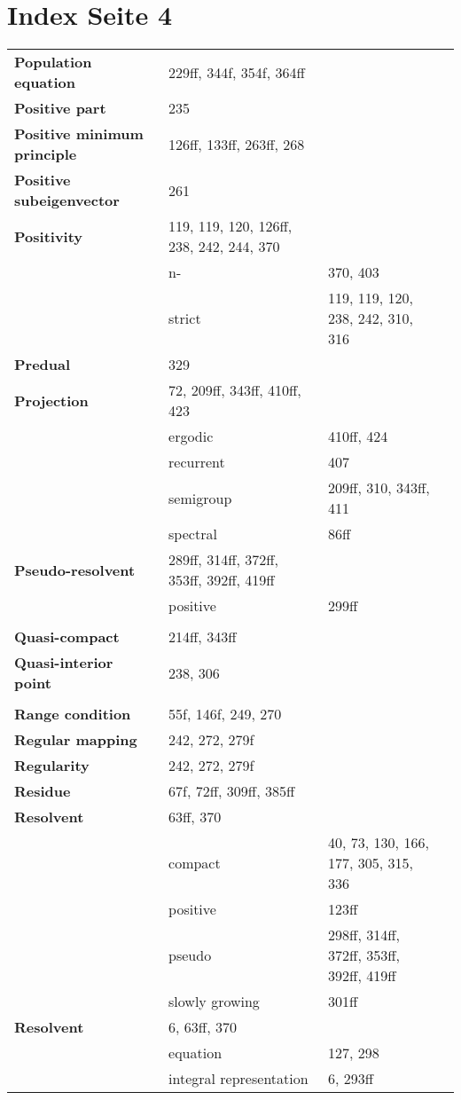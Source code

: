 \documentclass[10pt]{scrartcl}
\begin{document}
\pagestyle{empty}
\section*{Index Seite 4 }
\begin{longtable}{>{\bfseries}p{4cm}p{4cm}p{4cm}p{4cm}}

Population equation 	& 229ff, 344f, 354f, 364ff \\
Positive part 	& 235 \\
Positive minimum principle 	& 126ff, 133ff, 263ff, 268 \\
Positive subeigenvector 	& 261 \\
Positivity 	& 119, 119, 120, 126ff, 238, 242, 244, 370 \\
	& n- 	& 370, 403 \\
	& strict 	& 119, 119, 120, 238, 242, 310, 316 \\
Predual 	& 329 \\
Projection 	& 72, 209ff, 343ff, 410ff, 423 \\
	& ergodic 	& 410ff, 424 \\
	& recurrent 	& 407 \\
	& semigroup 	& 209ff, 310, 343ff, 411 \\
	& spectral 	& 86ff \\
Pseudo-resolvent 	& 289ff, 314ff, 372ff, 353ff, 392ff, 419ff \\
	& positive 	& 299ff \\
	& \\
Quasi-compact 	& 214ff, 343ff \\
Quasi-interior point 	& 238, 306 \\
	& \\
Range condition 	& 55f, 146f, 249, 270 \\
Regular mapping 	& 242, 272, 279f \\
Regularity 	& 242, 272, 279f \\
Residue 	& 67f, 72ff, 309ff, 385ff \\
Resolvent 	& 63ff, 370 \\
	& compact 	& 40, 73, 130, 166, 177, 305, 315, 336 \\
	& positive 	& 123ff \\
	& pseudo 	& 298ff, 314ff, 372ff, 353ff, 392ff, 419ff \\
	& slowly growing 	& 301ff \\
Resolvent 	& 6, 63ff, 370 \\
	& equation 	& 127, 298 \\
	& integral representation 	& 6, 293ff \\

\end{longtable}
\end{document}
